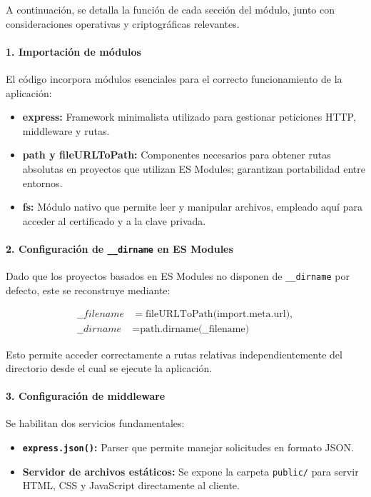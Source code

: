 A continuación, se detalla la función de cada sección del módulo, junto con consideraciones operativas y criptográficas relevantes.

\paragraph{1. Importación de módulos}
El código incorpora módulos esenciales para el correcto funcionamiento de la aplicación:
\begin{itemize}
  \item \textbf{express:} Framework minimalista utilizado para gestionar peticiones HTTP, middleware y rutas.
  \item \textbf{path y fileURLToPath:} Componentes necesarios para obtener rutas absolutas en proyectos que utilizan ES Modules; garantizan portabilidad entre entornos.
  \item \textbf{fs:} Módulo nativo que permite leer y manipular archivos, empleado aquí para acceder al certificado y a la clave privada.
\end{itemize}

\paragraph{2. Configuración de \texttt{\_\_dirname} en ES Modules}
Dado que los proyectos basados en ES Modules no disponen de \texttt{\_\_dirname} por defecto, este se reconstruye mediante:

\[
\begin{aligned}
\_\_filename &= \text{fileURLToPath(import.meta.url)}, \\
\_\_dirname  &= \text{path.dirname(\_\_filename)}
\end{aligned}
\]


Esto permite acceder correctamente a rutas relativas independientemente del directorio desde el cual se ejecute la aplicación.

\paragraph{3. Configuración de middleware}
Se habilitan dos servicios fundamentales:
\begin{itemize}
  \item \textbf{\texttt{express.json()}:} Parser que permite manejar solicitudes en formato JSON.
  \item \textbf{Servidor de archivos estáticos:} Se expone la carpeta \texttt{public/} para servir HTML, CSS y JavaScript directamente al cliente.
\end{itemize}

